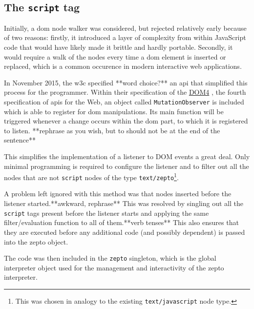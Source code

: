 \documentclass[oneside,11pt,xetex]{scrbook}
\begin{document}
\subsection{The \texttt{script} tag}
\label{sec:MutObs}

Initially, a \gls{dom} node walker was considered, but rejected relatively early because of two reasons:
firstly, it introduced a layer of complexity from within JavaScript code that would have likely made
it brittle and hardly portable. Secondly, it would require a walk of the nodes every time a \gls{dom}
element is inserted or replaced, which is a common occurence in modern interactive web applications.

In November 2015, the \gls{w3c} specified **word choice?** an \gls{api} that simplified this process for the programmer.
Within their specification of the \href{https://www.w3.org/TR/dom/#mutationobserver}{DOM4} \parencite{DOM4}, the
fourth specification of \gls{api}s for the Web, an object called \texttt{MutationObserver} is included which
is able to register for \gls{dom} manipulations. Its main function will be triggered whenever a change
occurs within the \gls{dom} part, to which it is registered to listen. **rephrase as you wish, but to should not be at the end of the sentence**

This simplifies the implementation of a listener to DOM events a great deal. Only minimal programming
is required to configure the listener and to filter out all the nodes that are not \texttt{script} nodes
of the type \texttt{text/zepto}\footnote{This was chosen in analogy to the existing \texttt{text/javascript}
node type.}.

A problem left ignored with this method was that nodes inserted before the listener started.**awkward, rephrase** This was resolved by
singling out all the \texttt{script} tags present before the listener starts and applying the
same filter/evaluation function to all of them.**verb tenses** This also ensures that they are executed before any
additional code (and possibly dependent) is passed into the zepto object.

The code was then included in the \texttt{zepto} singleton, which is the global interpreter object
used for the management and interactivity of the zepto interpreter.
\end{document}
